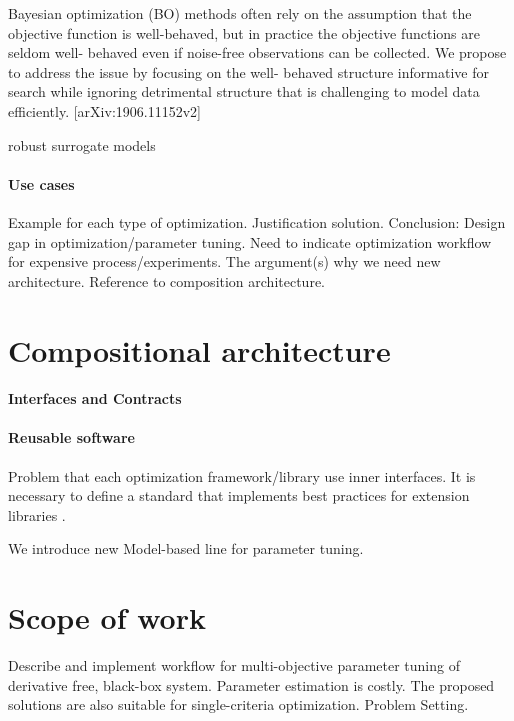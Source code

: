         Bayesian optimization (BO) methods often rely on the assumption that the objective function 
        is well-behaved, but in practice the objective functions are seldom well- behaved even if 
        noise-free observations can be collected. We propose to address the issue by focusing on 
        the well- behaved structure informative for search while ignoring detrimental structure 
        that is challenging to model data efficiently. [arXiv:1906.11152v2]

        robust surrogate models

        \cite{EngSurMod}

        \paragraph{Use cases}
        Example for each type of optimization. Justification solution.
        Conclusion: Design gap in optimization/parameter tuning. 
        Need to indicate optimization workflow for expensive process/experiments. 
        The argument(s) why we need new architecture. Reference to composition architecture.

    \section{Compositional architecture}
        \paragraph{Interfaces and Contracts}

        \paragraph{Reusable software}
        Problem that each optimization framework/library use inner interfaces. 
        It is necessary to define a standard that implements best practices for extension libraries \cite{buitinck2013api}.

        We introduce new Model-based line for parameter tuning. 

    \section{Scope of work}

        Describe and implement workflow for multi-objective parameter tuning of derivative free, black-box system. Parameter estimation is costly.
        The proposed solutions are also suitable for single-criteria optimization. Problem Setting.

